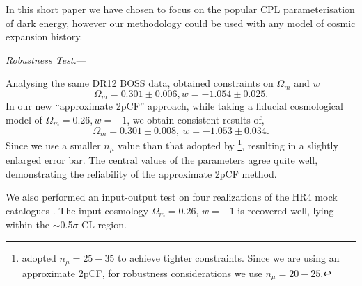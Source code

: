 \documentclass[prl,twocolumn,superscriptaddress,aps,amsmath,amssymb,nofootinbib,altaffilletter]{revtex4}
\begin{document}
In this short paper we have chosen to focus on the popular CPL parameterisation of dark energy, 
however our methodology could be used with any model of cosmic expansion history.


{\it Robustness Test.}---

Analysing the same DR12 BOSS data, \citet{Li2016} obtained constraints on $\Omega_m$ and $w$
\begin{equation}\label{eq:wcdm_constrain_default}
\Omega_m=0.301\pm 0.006, w=-1.054\pm 0.025.
\end{equation}
In our new ``approximate 2pCF'' approach, while taking a fiducial cosmological model of $\Omega_m=0.26, w=-1$, we obtain consistent results of,
\begin{equation}
\Omega_m = 0.301 \pm 0.008,\ w=-1.053\pm 0.034.
\end{equation}
Since we use a smaller $n_{\mu}$ value than that adopted by \citep{Li2016}
\footnote{\citep{Li2016} adopted $n_{\mu}=25-35$ to achieve tighter constraints.
Since we are using an approximate 2pCF, for robustness considerations we use $n_{\mu}=20-25$.}, 
resulting in a slightly enlarged error bar. 
The central values of the parameters agree quite well, demonstrating the reliability of the approximate 2pCF method.


We also performed an input-output test on four realizations of the HR4 mock catalogues \cite{hr4}.
The input cosmology $\Omega_m=0.26$, $w=-1$ is recovered well, lying within the $\sim$0.5$\sigma$ CL region.
\end{document}

